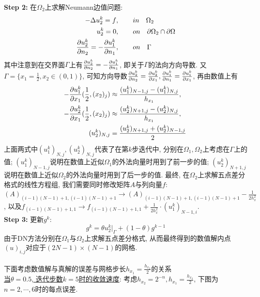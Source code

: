 \documentclass[12pt]{article}
\begin{document}
\noindent \textbf{Step 2:} 在$\Omega_2$上求解Neumann边值问题:
\begin{align*}
	-\Delta u_2^k=f&,\quad \quad in \quad \Omega_2\\
	u_2^k=0&,\quad \quad on \quad {\rm \partial}\Omega_2 \cap {\rm \partial}\Omega\\
	\frac{{\rm \partial }u_2^k}{{\rm \partial }n_2}=-\frac{{\rm \partial }u_1^k}{{\rm \partial }n_1}&,\quad \quad on \quad \Gamma
\end{align*}
其中注意到在交界面$\Gamma$上有$\frac{{\rm \partial }u_2^k}{{\rm \partial }n_2}=-\frac{{\rm \partial }u_1^k}{{\rm \partial }n_1}$, 即关于$\Gamma$的法向方向导数. 又$\Gamma=\{x_1=\frac{1}{2},x_2\in(0,1)\}$, 可知方向导数$\frac{{\rm \partial }u_2^k}{{\rm \partial }n_2}=\frac{{\rm \partial }u_2^k}{{\rm \partial }x_1},\frac{{\rm \partial }u_1^k}{{\rm \partial }n_1}=\frac{{\rm \partial }u_1^k}{{\rm \partial }x_1}$, 再由数值上有
\begin{align*}
	-\frac{{\rm \partial }u_1^k}{{\rm \partial }x_1}(\frac{1}{2},(x_2)_j)&\approx \frac{(u^{k}_{1})_{N-1,j}-(u^k_{1})_{N,j}}{h_{x_1}},\quad \\
	-\frac{{\rm \partial }u_2^k}{{\rm \partial }x_1}(\frac{1}{2},(x_2)_j)&\approx \frac{(u^{k}_{2})_{N+1,j}-(u^k_{2})_{N,j}}{h_{x_1}},\\
	(u^k_2)_{N,j}&=\frac{(u^k_2)_{N+1,j}+(u^k_2)_{N-1,j}}{2}
\end{align*}
\noindent 上面两式中$(u^k_1)_{N,j},(u^k_2)_{N,j}$代表了在第$k$步迭代中, 分别在$\Omega_1,\Omega_2$上考虑在$\Gamma$上的值; $(u_1^k)_{N-1,j}$说明在数值上近似$\Omega_1$的外法向量时用到了前一步的值; $(u_2^k)_{N+1,j}$说明在数值上近似$\Omega_2$的外法向量时用到了后一步的值. 最终, 在$\Omega_2$上求解五点差分格式的线性方程组, 我们需要同时修改矩阵$A$与列向量$f$: $(A)_{(i-1)(N-1)+1,(i-1)(N-1)+1}\rightarrow(A)_{(i-1)(N-1)+1,(i-1)(N-1)+1}-\frac{1}{2h_x^2}$, 以及$f_{(i-1)(N-1)+1,1}\rightarrow f_{(i-1)(N-1)+1,1}+\frac{1}{2h_x^2}\cdot(u^k_1)_{N-1,i}$.\\
\textbf{Step 3:} 更新$g^k$:$$g^k=\theta u^k_2\vert _\Gamma +(1-\theta)g^{k-1}$$
\noindent 由于DN方法分别在$\Omega_1$与$\Omega_2$上求解五点差分格式, 从而最终得到的数值解内点$(u)_{i,j}$对应于$(2N-1)\times(N-1)$的网格.\\
\quad \\
下面考虑数值解与真解的误差与网格步长$h_{x_1}=\frac{h_{x_2}}{2}$的关系\\
\noindent \underline{当$\theta=0.5$, 迭代步数$k=5$时的收敛速度}: 考虑$h_{x_2}=2^{-n},h_{x_1}=\frac{h_{x_2}}{2}$, 下图为$n=2,\cdots,6$时的每点误差.
\end{document}

